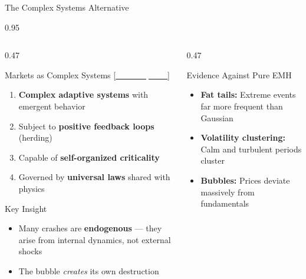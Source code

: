 \documentclass[9pt, aspectratio=169, t]{beamer}
\begin{document}
\begin{frame}{The Complex Systems Alternative}
    \begin{cminipage}{0.95\textwidth}
    {\footnotesize
    \begin{columns}[T]
        \begin{column}{0.47\textwidth}
            \begin{alertblock}{Markets as Complex Systems {\scriptsize[\href{https://press.princeton.edu/books/paperback/9780691175959/why-stock-markets-crash}{\textcolor{white}{Sornette, 2003}}]}}
                \begin{enumerate}\setlength{\itemsep}{0pt}
                    \item \textbf{Complex adaptive systems} with emergent behavior
                    \item Subject to \textbf{positive feedback loops} (herding)
                    \item Capable of \textbf{self-organized criticality}
                    \item Governed by \textbf{universal laws} shared with physics
                \end{enumerate}
            \end{alertblock}
            \vspace{-1mm}
            \begin{block}{Key Insight}
                \begin{itemize}\setlength{\itemsep}{0pt}
                    \item Many crashes are \textbf{endogenous} --- they arise from internal dynamics, not external shocks
                    \item The bubble \textit{creates} its own destruction
                \end{itemize}
            \end{block}
        \end{column}
        \begin{column}{0.47\textwidth}
            \begin{exampleblock}{Evidence Against Pure EMH}
                \begin{itemize}\setlength{\itemsep}{0pt}
                    \item \textbf{Fat tails:} Extreme events far more frequent than Gaussian
                    \item \textbf{Volatility clustering:} Calm and turbulent periods cluster
                    \item \textbf{Bubbles:} Prices deviate massively from fundamentals

\end{itemize}
\end{exampleblock}
\end{column}
\end{columns}}
\end{cminipage}
\end{frame}
\end{document}
